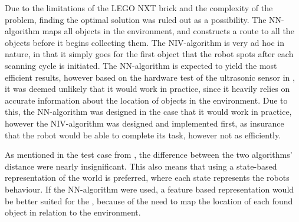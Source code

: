 Due to the limitations of the LEGO NXT brick and the complexity of the problem, finding the optimal solution was ruled out as a possibility. The NN-algorithm maps all objects in the environment, and constructs a route to all the objects before it begins collecting them. The NIV-algorithm is very ad hoc in nature, in that it simply goes for the first object that the robot spots after each scanning cycle is initiated. The NN-algorithm is expected to yield the most efficient results, however based on the hardware test of the ultrasonic sensor in , it was deemed unlikely that it would work in practice, since it heavily relies on accurate information about the location of objects in the environment. Due to this, the NN-algorithm was designed in the case that it would work in practice, however the NIV-algorithm was designed and implemented first, as insurance that the robot would be able to complete its task, however not as efficiently.

As mentioned in the test case from , the difference between the two algorithms' distance were nearly insignificant. This also means that using a state-based representation of the world is preferred, where each state represents the robots behaviour. If the NN-algorithm were used, a feature based representation would be better suited for the \projname{}, because of the need to map the location of each found object in relation to the environment.








